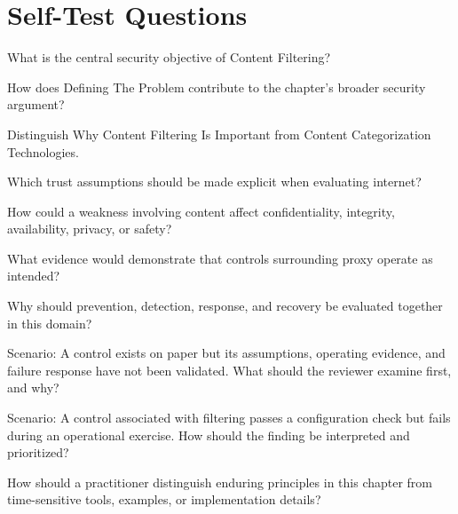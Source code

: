 \documentclass[11pt,letterpaper]{article}
\begin{document}
\section*{Self-Test Questions}
\begin{CornellRecallList}
\item What is the central security objective of Content Filtering?
\item How does Defining The Problem contribute to the chapter's broader security argument?
\item Distinguish Why Content Filtering Is Important from Content Categorization Technologies.
\item Which trust assumptions should be made explicit when evaluating internet?
\item How could a weakness involving content affect confidentiality, integrity, availability, privacy, or safety?
\item What evidence would demonstrate that controls surrounding proxy operate as intended?
\item Why should prevention, detection, response, and recovery be evaluated together in this domain?
\item Scenario: A control exists on paper but its assumptions, operating evidence, and failure response have not been validated. What should the reviewer examine first, and why?
\item Scenario: A control associated with filtering passes a configuration check but fails during an operational exercise. How should the finding be interpreted and prioritized?
\item How should a practitioner distinguish enduring principles in this chapter from time-sensitive tools, examples, or implementation details?
\end{CornellRecallList}
\end{document}
